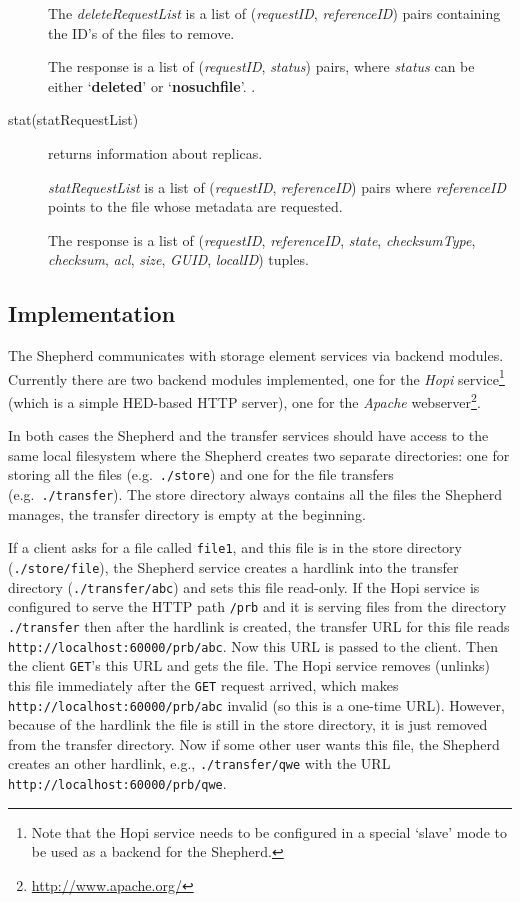 \documentclass{book}
\begin{document}
\begin{description}
    The \emph{deleteRequestList} is a list of (\emph{requestID}, \emph{referenceID}) pairs containing the ID's of the files to remove.
    
    The response is a list of (\emph{requestID}, \emph{status}) pairs, where \emph{status} can be either `\textbf{deleted}' or `\textbf{nosuchfile}'.
    .
    \item[stat(statRequestList)] returns information about replicas.

    \emph{statRequestList} is a list of (\emph{requestID}, \emph{referenceID}) pairs where \emph{referenceID} points to the file whose metadata are requested. 
    
    The response is a list of (\emph{requestID}, \emph{referenceID}, \emph{state}, \emph{checksumType}, \emph{checksum}, \emph{acl}, \emph{size}, \emph{GUID}, \emph{localID}) tuples.
\end{description}


\subsection{Implementation} %
\label{sub:shepherd_implementation}

The Shepherd communicates with storage element services via backend modules. Currently there are two backend modules implemented, one for the \emph{Hopi} service\footnote{Note that the Hopi service needs to be configured in a special `slave' mode to be used as a backend for the Shepherd.} (which is a simple HED-based HTTP server), one for the \emph{Apache} webserver\footnote{\url{http://www.apache.org/}}.

In both cases the Shepherd and the transfer services should have access to the same local filesystem where the Shepherd creates two separate directories: one for storing all the files (e.g.~\verb!./store!) and one for the file transfers (e.g.~\verb!./transfer!). The store directory always contains all the files the Shepherd manages, the transfer directory is empty at the beginning.

If a client asks for a file called \verb!file1!, and this file is in the store directory (\verb!./store/file!), the Shepherd service creates a hardlink into the transfer directory (\verb!./transfer/abc!) and sets this file read-only. If the Hopi service is configured to serve the HTTP path \verb!/prb! and it is serving files from the directory \verb!./transfer! then after the hardlink is created, the transfer URL for this file reads \verb!http://localhost:60000/prb/abc!. Now this URL is passed to the client. Then the client \verb!GET!'s this URL and gets the file. The Hopi service removes (unlinks) this file immediately after the \verb!GET! request arrived, which makes \verb!http://localhost:60000/prb/abc! invalid (so this is a one-time URL). However, because of the hardlink the file is still in the store directory, it is just removed from the transfer directory. Now if some other user wants this file, the Shepherd creates an other hardlink, e.g., \verb!./transfer/qwe! with the URL \verb!http://localhost:60000/prb/qwe!.
\end{document}
